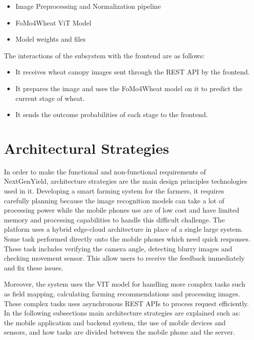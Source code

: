 \documentclass{FastFyp}
\begin{document}
\begin{itemize}
    \item Image Preprocessing and Normalization pipeline
    \item FoMo4Wheat ViT Model
    \item Model weights and files
\end{itemize}

The interactions of the subsystem with the frontend are as follows:

\begin{itemize}
    \item It receives wheat canopy images sent through the REST API by the
    frontend.

    \item It prepares the image and uses the FoMo4Wheat model on it to predict
    the current stage of wheat.

    \item It sends the outcome probabilities of each stage to the frontend.
\end{itemize}
 
\section{Architectural Strategies}
In order to make the functional and non-functional requirements of NextGenYield, architecture strategies are the main design principles technologies used in it. Developing a smart farming system for the farmers, it requires carefully planning because the image recognition models can take a lot of processing power while the mobile phones use are of low cost and have limited memory and processing capabilities to handle this difficult challenge. The platform uses a hybrid edge-cloud architecture in place of a single large system. Some task performed directly onto the mobile phones which need quick responses. These task includes verifying the camera angle, detecting blurry images and checking movement sensor. This allow users to receive the feedback immediately and fix these issues. 

Moreover, the system uses the VIT model for handling more complex tasks such as field mapping, calculating farming recommendations and processing images. These complex tasks uses asynchronous REST APIs to process request efficiently. In the following subsections main architecture strategies are explained such as: the mobile application and backend system, the use of mobile devices and sensors, and how tasks are divided between the mobile phone and the server.
\end{document}
